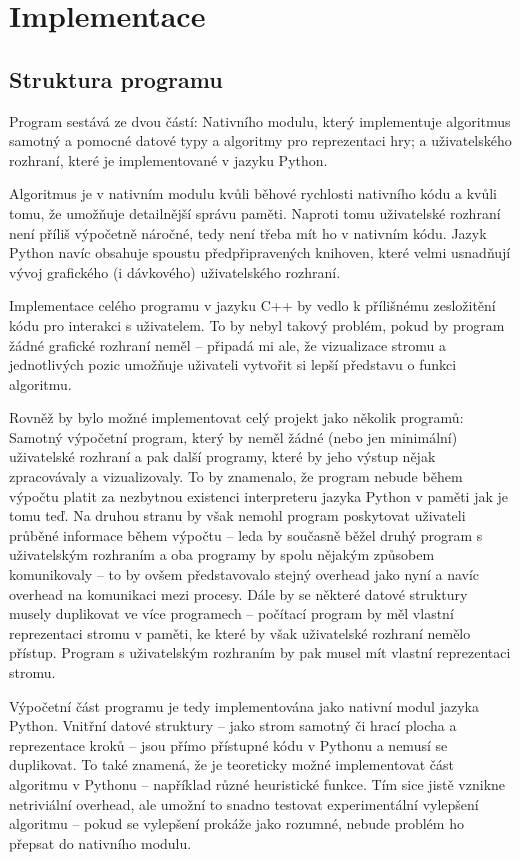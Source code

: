 \documentclass{article}
\begin{document}
\section{Implementace}
\subsection{Struktura programu}
Program sestává ze dvou částí: Nativního modulu, který implementuje algoritmus
samotný a pomocné datové typy a algoritmy pro reprezentaci hry; a uživatelského 
rozhraní, které je implementované v jazyku Python.

Algoritmus je v nativním modulu kvůli běhové rychlosti nativního kódu a kvůli
tomu, že umožňuje detailnější správu paměti. Naproti tomu uživatelské rozhraní 
není příliš výpočetně náročné, tedy není třeba mít ho v nativním kódu. Jazyk
Python navíc obsahuje spoustu předpřipravených knihoven, které velmi usnadňují
vývoj grafického (i dávkového) uživatelského rozhraní.

Implementace celého programu v jazyku C++ by vedlo k přílišnému zesložitění kódu
pro interakci s uživatelem. To by nebyl takový problém, pokud by program žádné 
grafické rozhraní neměl -- připadá mi ale, že vizualizace stromu a jednotlivých
pozic umožňuje uživateli vytvořit si lepší představu o funkci algoritmu.

Rovněž by bylo možné implementovat celý projekt jako několik programů: Samotný
výpočetní program, který by neměl žádné (nebo jen minimální) uživatelské 
rozhraní a pak další programy, které by jeho výstup nějak zpracovávaly a 
vizualizovaly. To by znamenalo, že program nebude během výpočtu platit za 
nezbytnou existenci interpreteru jazyka Python v paměti jak je tomu teď. Na 
druhou stranu by však nemohl program poskytovat uživateli průběné informace 
během výpočtu -- leda by současně běžel druhý program s uživatelským rozhraním 
a oba programy by spolu nějakým způsobem komunikovaly -- to by ovšem 
představovalo stejný overhead jako nyní a navíc overhead na komunikaci mezi 
procesy. Dále by se některé datové struktury musely duplikovat ve více 
programech -- počítací program by měl vlastní reprezentaci stromu v paměti, ke 
které by však uživatelské rozhraní nemělo přístup. Program s uživatelským 
rozhraním by pak musel mít vlastní reprezentaci stromu.

Výpočetní část programu je tedy implementována jako nativní modul jazyka Python.
Vnitřní datové struktury -- jako strom samotný či hrací plocha a reprezentace 
kroků -- jsou přímo přístupné kódu v Pythonu a nemusí se duplikovat. To také
znamená, že je teoreticky možné implementovat část algoritmu v Pythonu --
například různé heuristické funkce. Tím sice jistě vznikne netriviální overhead, 
ale umožní to snadno testovat experimentální vylepšení algoritmu -- pokud se
vylepšení prokáže jako rozumné, nebude problém ho přepsat do nativního modulu.
\end{document}
